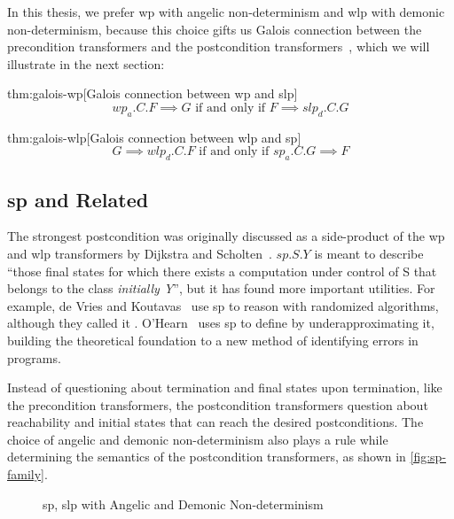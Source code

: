 In this thesis, we prefer wp with angelic non-determinism and wlp with demonic non-determinism, because this choice gifts us Galois connection between the precondition transformers and the postcondition transformers~\cite{zhang22}, which we will illustrate in the next section: 
\begin{theorem}{thm:galois-wp}[Galois connection between wp and slp]
	$$wp_a.C.F \implies G \text{ if and only if }F\implies slp_d.C.G$$
\end{theorem}

\begin{theorem}{thm:galois-wlp}[Galois connection between wlp and sp]
	$$G \implies wlp_d.C.F \text{ if and only if } sp_a.C.G\implies F$$
\end{theorem}

\subsection{sp and Related}
The strongest postcondition was originally discussed as a side-product of the wp and wlp transformers by Dijkstra and Scholten~\cite{dijkstra90}. 
$sp.S.Y$ is meant to describe ``those final states for which there exists a computation under control of S that belongs to the class \textit{initially Y}'', but it has found more important utilities. 
For example, de Vries and Koutavas~\cite{vries11} use sp to reason with randomized algorithms, although they called it . 
O'Hearn~\cite{ohearn2020IncorrectnessLogic} uses sp to define  by underapproximating it, building the theoretical foundation to a new method of identifying errors in programs. 

Instead of questioning about termination and final states upon termination, like the precondition transformers, the postcondition transformers question about reachability and initial states that can reach the desired postconditions. 
The choice of angelic and demonic non-determinism also plays a rule while determining the semantics of the postcondition transformers, as shown in \autoref{fig:sp-family}. 

\begin{figure}[ht]\centering
	\hfill

	\hfill
	\caption{sp, slp with Angelic and Demonic Non-determinism}
	\label{fig:sp-family}
\end{figure}

